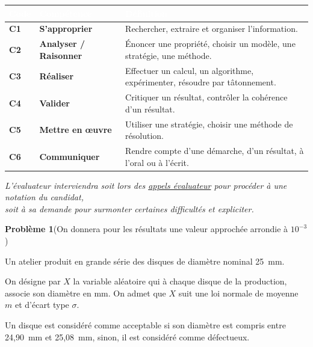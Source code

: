 \documentclass[a4paper,11pt]{article}
\newcommand{\probleme}[2]{%
    \vspace{12pt}%
    \noindent%
    \begin{tcolorbox}[
        colback=problem-bg,
        colframe=uimm-blue,
        boxrule=1.5pt,
        arc=4pt,
        left=8pt, right=8pt,
        top=6pt, bottom=6pt
    ]
        {\fontfamily{pcr}\selectfont\bfseries\large Problème #1}\quad #2
    \end{tcolorbox}%
    \vspace{6pt}%
}
\newcommand{\tableauCompetences}{%
\begin{center}
\renewcommand{\arraystretch}{1.5}
\begin{tabular}{|>{\centering\arraybackslash\bfseries\color{white}\columncolor{uimm-blue}}m{1cm}|>{\bfseries\columncolor{uimm-blue!10}}m{4cm}|m{9cm}|}
\hline
\rowcolor{uimm-blue}
\textcolor{white}{Code} & \textcolor{white}{Compétence} & \textcolor{white}{Définition} \\
\hline
C1 & S'approprier & Rechercher, extraire et organiser l'information. \\
\hline
C2 & Analyser / Raisonner & Énoncer une propriété, choisir un modèle, une stratégie, une méthode. \\
\hline
C3 & Réaliser & Effectuer un calcul, un algorithme, expérimenter, résoudre par tâtonnement. \\
\hline
C4 & Valider & Critiquer un résultat, contrôler la cohérence d'un résultat. \\
\hline
C5 & Mettre en œuvre & Utiliser une stratégie, choisir une méthode de résolution. \\
\hline
C6 & Communiquer & Rendre compte d'une démarche, d'un résultat, à l'oral ou à l'écrit. \\
\hline
\end{tabular}
\end{center}%
}
\begin{document}
\begin{tcolorbox}[colback=white, colframe=uimm-blue, boxrule=1pt, arc=4pt, title={\textbf{\textcolor{white}{COMPÉTENCES EVALUÉES}}}, attach boxed title to top center={yshift=-2mm}, boxed title style={colback=uimm-blue, arc=2pt}]
    \tableauCompetences
\end{tcolorbox}

\vspace{0.4cm}
\begin{center}
\textit{\small L'évaluateur interviendra soit lors des \underline{appels évaluateur} pour procéder à une notation du candidat,\\ soit à sa demande pour surmonter certaines difficultés et expliciter.}
\end{center}

\newpage


\probleme{1}{\normalsize (On donnera pour les résultats une valeur approchée arrondie à $10^{-3}$)}

Un atelier produit en grande série des disques de diamètre nominal 25~mm.

On désigne par $X$ la variable aléatoire qui à chaque disque de la production, associe son diamètre en mm. On admet que $X$ suit une loi normale de moyenne $m$ et d'écart type $\sigma$.

Un disque est considéré comme acceptable si son diamètre est compris entre 24,90~mm et 25,08~mm, sinon, il est considéré comme défectueux.

\bigskip
\end{document}
